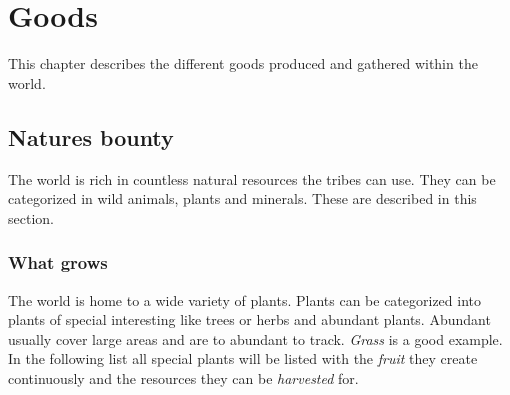 \documentclass[a4paper]{book}
\begin{document}
% 
%
% 
% 
% 
% 

\chapter{Goods}
This chapter describes the different goods produced and gathered within the world.

\section{Natures bounty}
The world is rich in countless natural resources the tribes can use.
They can be categorized in wild animals, plants and minerals.
These are described in this section.

\subsection{What grows}
The world is home to a wide variety of plants.
Plants can be categorized into plants of special interesting like trees
or herbs and abundant plants.
Abundant usually cover large areas and are to abundant to track.
\emph{Grass} is a good example.
In the following list all special plants will be listed with
the \emph{fruit} they create continuously and the resources they can be
\emph{harvested} for.
\end{document}
